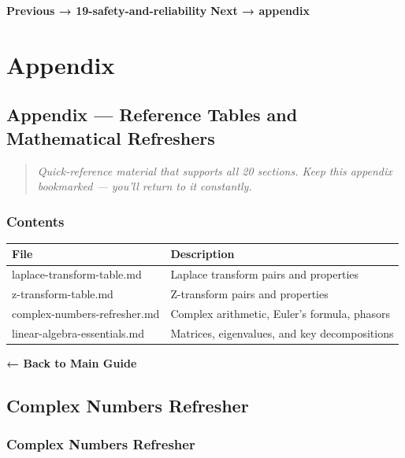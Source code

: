 \documentclass[11pt,a4paper]{book}
\begin{document}
\begin{itemize}
\medskip\noindent\hrulefill\medskip

\textbf{Previous → 19-safety-and-reliability}  
\textbf{Next → appendix}


\appendix
\chapter{Appendix}
\section{Appendix — Reference Tables and Mathematical Refreshers}

\begin{quote}
\textit{Quick-reference material that supports all 20 sections. Keep this appendix bookmarked — you'll return to it constantly.}
\end{quote}

\medskip\noindent\hrulefill\medskip

\subsection{Contents}

\begin{center}
\begin{tabular}{|l|l|}
\hline
File & Description \\
\hline
laplace-transform-table.md & Laplace transform pairs and properties \\
z-transform-table.md & Z-transform pairs and properties \\
complex-numbers-refresher.md & Complex arithmetic, Euler's formula, phasors \\
linear-algebra-essentials.md & Matrices, eigenvalues, and key decompositions \\
\hline
\end{tabular}
\end{center}

\medskip\noindent\hrulefill\medskip

\textbf{← Back to Main Guide}


\section{Complex Numbers Refresher}
\subsection{Complex Numbers Refresher}


\end{itemize}
\end{document}
